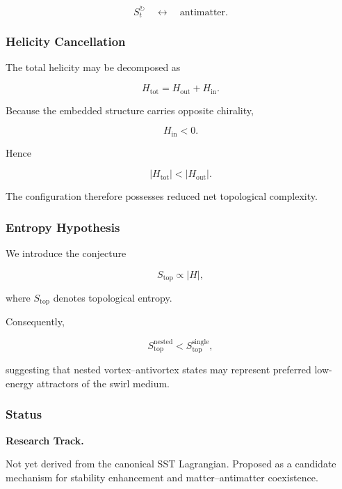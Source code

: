         \[
            S_t^{\circlearrowright}
            \quad\leftrightarrow\quad
            \text{antimatter}.
        \]
    
    \subsubsection{Helicity Cancellation}
        
        The total helicity may be decomposed as
        
        \[
            H_{\mathrm{tot}}
            =
            H_{\mathrm{out}}
            +
            H_{\mathrm{in}}.
        \]
        
        Because the embedded structure carries opposite chirality,
        
        \[
            H_{\mathrm{in}}<0.
        \]
        
        Hence
        
        \[
            |H_{\mathrm{tot}}|
            <
            |H_{\mathrm{out}}|.
        \]
        
        The configuration therefore possesses reduced net topological complexity.
    
    \subsubsection{Entropy Hypothesis}
        
        We introduce the conjecture
        
        \[
            S_{\mathrm{top}}
            \propto
            |H|,
        \]
        
        where $S_{\mathrm{top}}$ denotes topological entropy.
        
        Consequently,
        
        \[
            S_{\mathrm{top}}^{\mathrm{nested}}
            <
            S_{\mathrm{top}}^{\mathrm{single}},
        \]
        
        suggesting that nested vortex--antivortex states may represent preferred
        low-energy attractors of the swirl medium.
    
    \subsubsection{Status}
        
        \textbf{Research Track.}
        
        Not yet derived from the canonical SST Lagrangian.
        Proposed as a candidate mechanism for stability enhancement and
        matter--antimatter coexistence.
    
